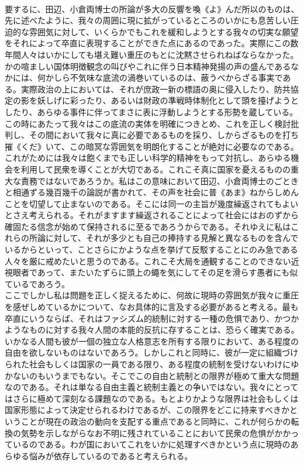\documentclass[8pt]{extreport}
\begin{document}
\begin{CJK}{UTF8}{min}
\\	要するに、田辺、小倉両博士の所論が多大の反響を喚《よ》んだ所以のものは、先に述べたように、我々の周囲に現に拡がっているところのいかにも息苦しい圧迫的な雰囲気に対して、いくらかでもこれを緩和しようとする我々の切実な願望をそれによって卒直に表現することができた点にあるのであった。実際にこの数年間人々はいかにしても堪え難い重圧のもとに沈黙させられねばならなかった。かの喧ましい国体明徴観念の叫びやこれに伴う日本精神発揚の声の盛んであるなかには、何かしら不気味な底流の渦巻いているのは、蔽うべからざる事実である。実際政治の上においては、それが庶政一新の標語の奥に侵入したり、防共協定の影を妖しげに彩ったり、あるいは財政の準戦時体制化として頭を擡げようとしたり、あらゆる事件に伴ってまさに表に浮動しようとする形勢を蔵している。この時にあたって我々はこの底流の実体を明確につきとめ、これを正しく検討批判し、その間において我々に真に必要であるものを採り、しからざるものを打ち摧《くだ》いて、この暗冥な雰囲気を明朗化することが絶対に必要なのである。これがためには我々は飽くまでも正しい科学的精神をもって対抗し、あらゆる機会を利用して民衆を導くことが大切である。これこそ真に国家を憂えるものの重大な責務ではないであろうか。私はこの意味において田辺、小倉両博士のごときと相通ずる幾百幾千の論説が書かれて、その声を社会に普《あま》ねからしめんことを切望して止まないのである。そこには同一の主旨が幾度繰返されてもよいとさえ考えられる。それがますます繰返されることによって社会にはおのずから確固たる信念が始めて保持されるに至るであろうからである。それゆえに私はこれらの所論に対して、それが多少とも自己の捧持する見解と異なるものを含んでいるからといって、ことさらにかような点を挙げて反駁することにのみ急である人々を厳に戒めたいと思うのである。これこそ大局を通観することのできない近視眼者であって、またいたずらに頭上の蠅を気にしてその足を滑らす愚者にも似ているであろう。
\\	ここでしかし私は問題を正しく捉えるために、何故に現時の雰囲気が我々に重圧を感ぜしめているかについて、なお具体的に言及する必要があると考える。最も卒直にいうならば、それはファシズム的統制に対する一種の危惧であり、かつかようなものに対する我々人間の本能的反抗に存することは、恐らく確実である。いかなる人間も彼が一個の独立な人格意志を所有する限りにおいて、ある程度の自由を欲しないものはないであろう。しかしこれと同時に、彼が一定に組織づけられた社会もしくは国家の一員である限り、ある程度の統制を受けないわけにゆかないのもいうまでもない。そこでこの自由と統制との限界が極めて重大な問題なのである。それは単なる自由主義と統制主義との争いではない。我々にとってはさらに極めて深刻なる課題なのである。もとよりかような限界は社会もしくは国家形態によって決定せられるわけであるが、この限界をどこに持来すべきかということが現在の政治の動向を支配する重点であると同時に、これが何らかの転換の気勢を示しながらなお不明に残されていることにおいて民衆の危惧がかかっているのである。わが国においてこれをいかに処理すべきかという点に現時のあらゆる悩みが依存しているのであると考えられる。

\end{CJK}
\end{document}
